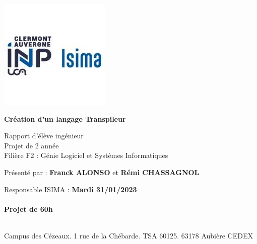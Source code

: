 \begin{titlepage}
    \includegraphics{img/logo_isima_inp.jpeg}
       \begin{center}
           \vspace*{1cm}

           \Huge
           \textbf{Création d'un langage Transpileur}

           \vspace{0.5cm}
           \LARGE
           Rapport d'élève ingénieur\\
           Projet de 2 année\\
           Filière F2 : Génie Logiciel et Systèmes Informatiques

           \vspace{1.5cm}

           Présenté par : \textbf{Franck ALONSO} et \textbf{Rémi CHASSAGNOL}

           \vfill

           \vspace{0.5cm}
         \end{center}


           \large
           \noindent
           Responsable ISIMA : \hfill \textbf{Mardi 31/01/2023}\\~\\
           \raggedleft \textbf{Projet de 60h}\\~\\
           \raggedright
           Campus des Cézeaux. 1 rue de la Chébarde. TSA 60125. 63178 Aubière CEDEX\\



   \end{titlepage}
